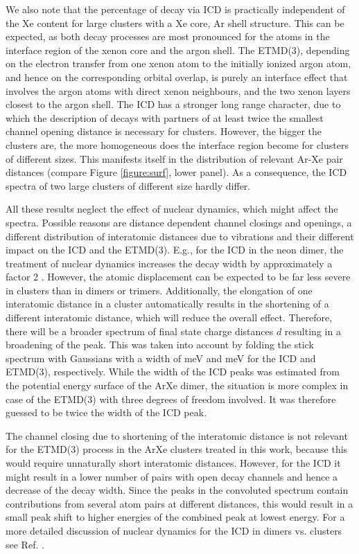 \documentclass[journal=jpccck,manuscript=article]{achemso}
\begin{document}
We also note that the percentage of decay via ICD is practically
independent of the Xe content for large clusters with a Xe core, Ar shell structure.
This can be expected, as both decay processes are most pronounced for the
atoms in the interface region of the xenon core and the argon shell.
The ETMD(3), depending on the electron transfer from one xenon atom to the
initially ionized argon atom, and hence on the corresponding orbital overlap,
is purely an interface effect that involves the argon atoms with direct xenon
neighbours, and the two xenon layers closest to the argon shell.
The ICD has a stronger long range character, due to which the description
of decays with partners of at least twice the smallest channel opening
distance is necessary for clusters. However, the bigger the clusters are,
the more homogeneous does the interface region become for clusters of
different sizes. This manifests itself in the distribution of relevant
Ar-Xe pair distances (compare Figure \ref{figure:surf}, lower panel).
As a consequence, the ICD spectra of two large clusters of different size
hardly differ.

All these results neglect the effect of nuclear dynamics, which might
affect the spectra. Possible reasons are distance dependent channel closings
and openings,
a different distribution of interatomic distances due to vibrations
and their different impact on
the ICD and the ETMD(3). E.g., for the ICD in the neon dimer, the treatment of
nuclear dynamics increases the decay width by approximately a factor 2
\cite{Schnorr15}.
However, the atomic displacement can be expected to be far less severe
in clusters than in dimers or trimers. Additionally, 
the elongation of one interatomic distance in a cluster
automatically results in
the shortening of a different interatomic distance, which will reduce
the overall effect. Therefore, there will be a broader spectrum  of final
state charge distances
$d$ resulting in a broadening of the peak. This was taken into
account by folding the stick spectrum with Gaussians with a width of
\unit[300]{meV} and \unit[600]{meV} for the ICD and ETMD(3), respectively.
While the width of the ICD peaks was estimated from the potential energy
surface of the ArXe dimer, the situation is more complex in case of the ETMD(3)
with three degrees of freedom involved. It was therefore guessed to be twice the
width of the ICD peak.

The channel closing due to shortening of the interatomic distance is not
relevant for the ETMD(3) process in the ArXe clusters treated in this work,
because this would require unnaturally short interatomic distances.
However, for the ICD it might result in a lower number of pairs with open
decay channels and hence a decrease of the decay width. 
Since the peaks in the convoluted spectrum 
contain contributions from several atom pairs at different distances, 
this would result
in a small peak shift to higher energies of the combined peak at lowest energy.
For a more detailed discussion of nuclear dynamics for the ICD in dimers vs.
clusters see Ref. .
\end{document}
